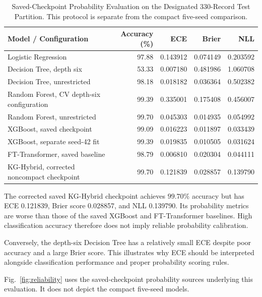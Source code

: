\begin{table}[t]
\centering
\caption{Saved-Checkpoint Probability Evaluation on the Designated
330-Record Test Partition. This protocol is separate from the
compact five-seed comparison.}
\label{tab:calibration}
\small
\begin{tabular}{lrrrr}
\hline
Model / Configuration
& Accuracy (\%) & ECE & Brier & NLL \\
\hline
Logistic Regression
& 97.88 & 0.143912 & 0.074149 & 0.203592 \\

Decision Tree, depth six
& 53.33 & 0.007180 & 0.481986 & 1.060708 \\

Decision Tree, unrestricted
& 98.18 & 0.018182 & 0.036364 & 0.502382 \\

Random Forest, CV depth-six configuration
& 99.39 & 0.335001 & 0.175408 & 0.456007 \\

Random Forest, unrestricted
& 99.70 & 0.045303 & 0.014935 & 0.054992 \\

XGBoost, saved checkpoint
& 99.09 & 0.016223 & 0.011897 & 0.033439 \\

XGBoost, separate seed-42 fit
& 99.39 & 0.019835 & 0.010505 & 0.031624 \\

FT-Transformer, saved baseline
& 98.79 & 0.006810 & 0.020304 & 0.044111 \\

KG-Hybrid, corrected noncompact checkpoint
& 99.70 & 0.121839 & 0.028857 & 0.139790 \\
\hline
\end{tabular}
\end{table}

The corrected saved KG-Hybrid checkpoint achieves
$99.70\%$ accuracy but has ECE 0.121839, Brier score
0.028857, and NLL 0.139790. Its probability metrics are worse
than those of the saved XGBoost and FT-Transformer baselines.
High classification accuracy therefore does not imply reliable
probability calibration.

Conversely, the depth-six Decision Tree has a relatively small ECE
despite poor accuracy and a large Brier score. This illustrates
why ECE should be interpreted alongside classification performance
and proper probability scoring rules.

Fig.~\ref{fig:reliability} uses the saved-checkpoint probability
sources underlying this evaluation. It does not depict the
compact five-seed models.

